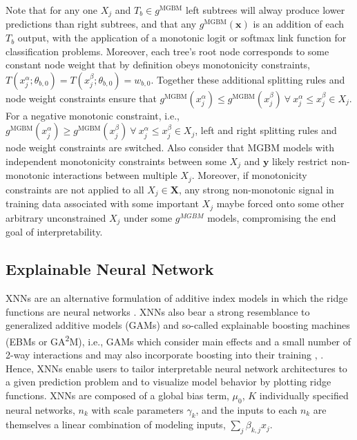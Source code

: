 \documentclass[information,article,submit,moreauthors,pdftex]{definitions/mdpi}
\begin{document}
\noindent Note that for any one $X_j$ and $T_b \in g^{\text{MGBM}}$ left subtrees will alway produce lower predictions than right subtrees, and that any $g^{\text{MGBM}}(\mathbf{x})$ is an addition of each $T_b$ output, with the application of a monotonic logit or softmax link function for classification problems. Moreover, each tree's root node corresponds to some constant node weight that by definition obeys monotonicity constraints, $ T(x^{\alpha}_j; \theta_{b,0}) = T(x^{\beta}_j; \theta_{b,0}) = w_{b,0}$. Together these additional splitting rules and node weight constraints ensure that $g^{\text{MGBM}}(x^{\alpha}_j)  \le g^{\text{MGBM}}(x^{\beta}_j) ~\forall ~x^{\alpha}_j \le x^{\beta}_j \in X_j$. For a negative monotonic constraint, i.e., $g^{\text{MGBM}}(x^{\alpha}_j)  \ge g^{\text{MGBM}}(x^{\beta}_j) ~\forall ~x^{\alpha}_j \le x^{\beta}_j \in X_j$, left and right splitting rules and node weight constraints are switched. Also consider that MGBM models with independent monotonicity constraints between some $X_j$ and $\mathbf{y}$ likely restrict non-monotonic interactions between multiple $X_j$. Moreover, if monotonicity constraints are not applied to all $X_j \in \mathbf{X}$, any strong non-monotonic signal in training data associated with some important $X_j$ maybe forced onto some other arbitrary unconstrained $X_j$ under some $g^{MGBM}$ models, compromising the end goal of interpretability.

\subsection{Explainable Neural Network}\label{a_ssec:xnn}

XNNs are an alternative formulation of additive index models in which the ridge functions are neural networks \cite{wf_xnn}. XNNs also bear a strong resemblance to generalized additive models (GAMs) and so-called explainable boosting machines (EBMs or GA\textsuperscript{2}M), i.e., GAMs which consider main effects and a small number of 2-way interactions and may also incorporate boosting into their training \cite{esl}, \cite{ga2m}.  Hence, XNNs enable users to tailor interpretable neural network architectures to a given prediction problem and to visualize model behavior by plotting ridge functions. XNNs are composed of a global bias term, $\mu_0$, $K$ individually specified neural networks, $n_k$ with scale parameters $\gamma_k$, and the inputs to each $n_k$ are themselves a linear combination of modeling inputs, $\sum_j\beta_{k,j}x_j$.
\end{document}
